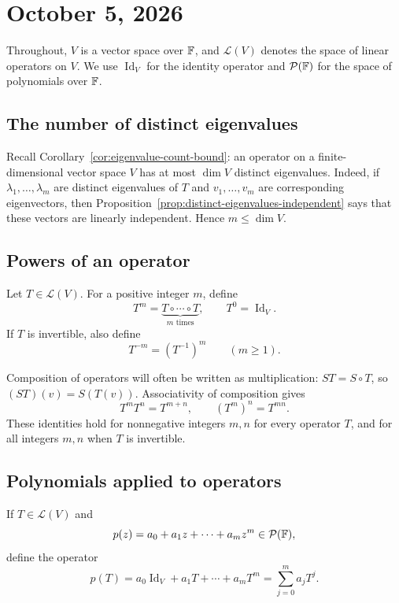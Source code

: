 \section{October 5, 2026}

Throughout, $V$ is a vector space over $\mathbb{F}$, and
$\mathcal L(V)$ denotes the space of linear operators on $V$.
We use $\operatorname{Id}_V$ for the identity operator and
$\mathcal P(\mathbb{F})$ for the space of polynomials over $\mathbb{F}$.

\subsection{The number of distinct eigenvalues}

Recall Corollary~\ref{cor:eigenvalue-count-bound}: an operator on a
finite-dimensional vector space $V$ has at most $\dim V$ distinct
eigenvalues. Indeed, if $\lambda_1,\ldots,\lambda_m$ are distinct
eigenvalues of $T$ and $v_1,\ldots,v_m$ are corresponding eigenvectors,
then Proposition~\ref{prop:distinct-eigenvalues-independent} says that
these vectors are linearly independent. Hence $m\leq\dim V$.

\subsection{Powers of an operator}

\begin{definition}
  Let $T\in\mathcal L(V)$. For a positive integer $m$, define
  \[
    T^m=\underbrace{T\circ\cdots\circ T}_{m\text{ times}},
    \qquad T^0=\operatorname{Id}_V.
  \]
  If $T$ is invertible, also define
  \[
    T^{-m}=(T^{-1})^m\qquad(m\geq1).
  \]
\end{definition}

Composition of operators will often be written as multiplication:
$ST=S\circ T$, so $(ST)(v)=S(T(v))$. Associativity of composition gives
\[
  T^mT^n=T^{m+n},\qquad (T^m)^n=T^{mn}.
\]
These identities hold for nonnegative integers $m,n$ for every
operator $T$, and for all integers $m,n$ when $T$ is invertible.

\subsection{Polynomials applied to operators}

\begin{definition}
  If $T\in\mathcal L(V)$ and
  \[
    p(z)=a_0+a_1z+\cdots+a_mz^m\in\mathcal P(\mathbb{F}),
  \]
  define the operator
  \[
    p(T)=a_0\operatorname{Id}_V+a_1T+\cdots+a_mT^m
      =\sum_{j=0}^m a_jT^j.
  \]
\end{definition}


